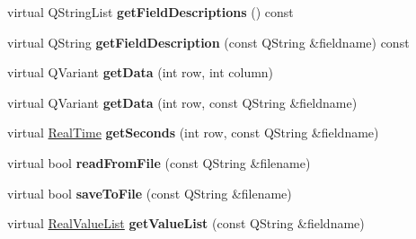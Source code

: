 \begin{DoxyCompactItemize}
\mbox{\label{class_annotation_data_table_ad1288d2aa7fe792846ff8ad3aa82e330}} 
virtual Q\+String\+List {\bfseries get\+Field\+Descriptions} () const
\item 
\mbox{\label{class_annotation_data_table_a60a351378304306138282bf0abeaae49}} 
virtual Q\+String {\bfseries get\+Field\+Description} (const Q\+String \&fieldname) const
\item 
\mbox{\label{class_annotation_data_table_aca3b008ac804aa4161d535f8e156666e}} 
virtual Q\+Variant {\bfseries get\+Data} (int row, int column)
\item 
\mbox{\label{class_annotation_data_table_a1668a4b81487d426455ae4991c98ee76}} 
virtual Q\+Variant {\bfseries get\+Data} (int row, const Q\+String \&fieldname)
\item 
\mbox{\label{class_annotation_data_table_a21098ca0767b4271c09067a71a7816ad}} 
virtual \hyperlink{struct_real_time}{Real\+Time} {\bfseries get\+Seconds} (int row, const Q\+String \&fieldname)
\item 
\mbox{\label{class_annotation_data_table_a8eabd054b682733828d77063c689c873}} 
virtual bool {\bfseries read\+From\+File} (const Q\+String \&filename)
\item 
\mbox{\label{class_annotation_data_table_a406d1a6f7cebcbd390a975bf06c61636}} 
virtual bool {\bfseries save\+To\+File} (const Q\+String \&filename)
\item 
\mbox{\label{class_annotation_data_table_aa85289b28a3d6e5d9def64f899f95fc9}} 
virtual \hyperlink{class_real_value_list}{Real\+Value\+List} {\bfseries get\+Value\+List} (const Q\+String \&fieldname)
\end{DoxyCompactItemize}
